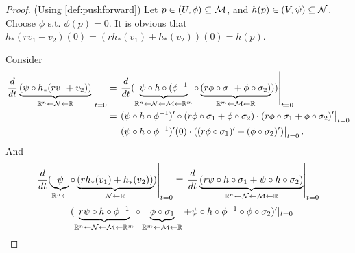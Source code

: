 \documentclass[../main.tex]{subfiles}
\begin{document}
    \begin{proof}
        (Using \cref{def:pushforward})
        Let \(p \in (U, \phi) \subseteq \manifold[M]\), and 
        \(h(p) \in (V, \psi) \subseteq \manifold[N]\). Choose \(\phi\) s.t. 
        \(\phi(p) = 0\).
        It is obvious that \(h_*(rv_1+v_2)(0) = (rh_*(v_1)+h_*(v_2))(0) = h(p)\). 
        \par
        Consider 
        \[
        \begin{aligned}
            \left.\frac{d}{dt}
            \underbrace{(\psi \circ h_*(rv_1+v_2))}_{\mathbb{R}^n \leftarrow 
            \manifold[N] \leftarrow \mathbb{R}}\right|_{t=0}
            &= \left.\frac{d}{dt}(\underbrace{\psi\circ h\circ (\phi ^{-1}}
            _{\mathbb{R}^n \leftarrow \manifold[N] \leftarrow \manifold[M] 
            \leftarrow \mathbb{R}^m}\circ
            \underbrace{(r\phi\circ\sigma_1+\phi\circ\sigma_2)}_{\mathbb{R}^m 
            \leftarrow \manifold[M] \leftarrow \mathbb{R}}))\right|_{t=0} \\
            &= \left.(\psi \circ h \circ \phi ^{-1})'\circ 
            (r\phi\circ\sigma_1+\phi\circ\sigma_2) \cdot (r\phi\circ\sigma_1 + 
            \phi\circ\sigma_2)'\right|_{t=0} \\
            &= \left.(\psi \circ h \circ \phi ^{-1})'(0) \cdot 
            ((r\phi\circ\sigma_1)' + (\phi\circ\sigma_2)')\right|_{t=0}.
        \end{aligned}
        \]
        And 
        \[
        \begin{aligned}
            \left.\frac{d}{dt}
            (\underbrace{\psi}_{\mathbb{R}^n\leftarrow} \circ 
            \underbrace{(rh_*(v_1)+h_*(v_2))}_{\manifold[N]\leftarrow 
            \mathbb{R}})
            \right|_{t=0}
            &= \left.\frac{d}{dt}
            \underbrace{(r\psi\circ h \circ \sigma_1 + \psi \circ h \circ \sigma_2)}_
            {\mathbb{R}^n \leftarrow \manifold[N] \leftarrow \manifold[M] \leftarrow 
            \mathbb{R}}
            \right|_{t=0} \\
        \end{aligned}
        \]
        \[
        \begin{aligned}
        =&(\underbrace{r\psi\circ h\circ \phi ^{-1}}_
        {\mathbb{R}^n\leftarrow\manifold[N]\leftarrow\manifold[M]
        \leftarrow\mathbb{R}^m} \circ \underbrace{\phi \circ \sigma_1}_
        {\mathbb{R}^m\leftarrow\manifold[M]\leftarrow\mathbb{R}} + 
        \psi\circ h\circ \phi ^{-1} \circ \phi \circ \sigma_2
        )'|_{t=0} \\

\end{aligned}\]
\end{proof}
\end{document}
